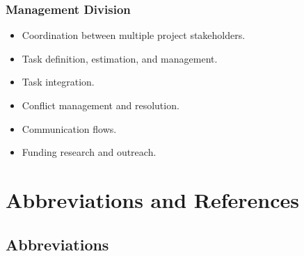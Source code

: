 \documentclass[a4paper,12pt,twoside]{article}
\begin{document}
\subsubsection{Management Division}

\begin{itemize}
    \item Coordination between multiple project stakeholders.
    \item Task definition, estimation, and management.
    \item Task integration.
    \item Conflict management and resolution.
    \item Communication flows.
    \item Funding research and outreach.
\end{itemize}
\pagebreak
\section{Abbreviations and References}

\subsection{Abbreviations}
\end{document}
